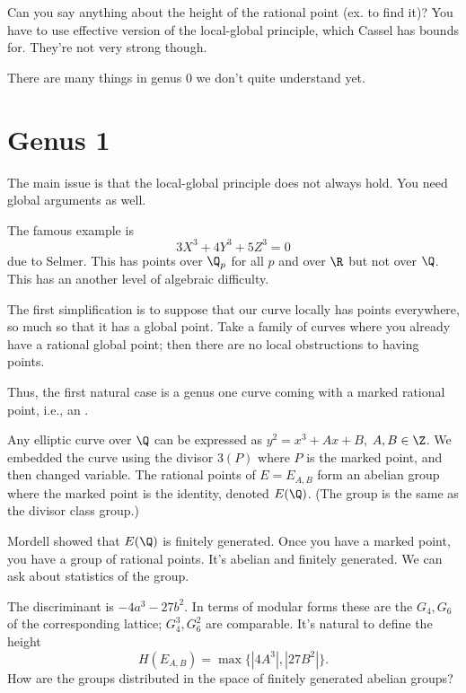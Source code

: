 Can you say anything about the height of the rational point (ex. to find it)? 
You have to use effective version of the local-global principle, which Cassel has bounds for. They're not very strong though.
%

There are many things in genus 0 we don't quite understand yet.

\section{Genus 1}

The main issue is that the local-global principle does not always hold. You need global arguments as well.

The famous example is
\[
3X^3+4Y^3+5Z^3=0
\]
due to Selmer. This has points over $\Q_p$ for all $p$ and over $\R$ but not over $\Q$. This has an another level of algebraic difficulty.

The first simplification is to suppose that our curve locally has points everywhere, so much so that it has a global point. Take a family of curves where you already have a rational global point; then there are no local obstructions to having points. 

\begin{ex}\label{ex:genus1-1}
Thus, the first natural case is a genus one curve coming with a marked rational point, i.e., an .\end{ex}

Any elliptic curve over $\Q$ can be expressed as $y^2 = x^3 + Ax+B$, $A,B\in \Z$. 
We embedded the curve using the divisor $3(P)$ where $P$ is the marked point, and then changed variable. 
The rational points of $E=E_{A,B}$ form an abelian group where the marked point is the identity, denoted $E(\Q)$. (The group is the same as the divisor class group.)

Mordell showed that $E(\Q)$ is finitely generated. Once you have a marked point, you have a group of rational points. It's abelian and finitely generated. We can ask about statistics of the group. 

The discriminant is $-4a^3-27b^2$. In terms of modular forms these are the $G_4,G_6$ of the corresponding lattice; $G_4^3,G_6^2$ are comparable. It's natural to define the height 
\[
H(E_{A,B}) = \max\{|4A^3|, |27B^2|\}.
\]
How are the groups distributed in the space of finitely generated abelian groups?

